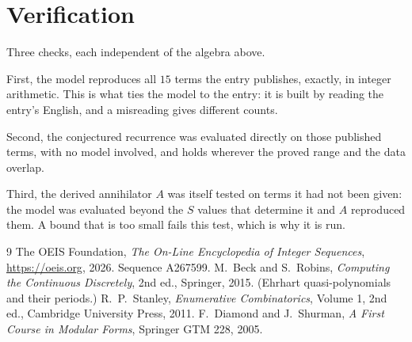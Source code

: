 \documentclass[11pt,a4paper]{article}
\theoremstyle{plain}
\theoremstyle{definition}
\begin{document}
\section{Verification}

Three checks, each independent of the algebra above.

First, the model reproduces all $15$ terms the entry publishes, exactly, in integer
arithmetic. This is what ties the model to the entry: it is built by reading the entry's
English, and a misreading gives different counts.

Second, the conjectured recurrence was evaluated directly on those published terms, with no
model involved, and holds wherever the proved range and the data overlap.

Third, the derived annihilator $A$ was itself tested on terms it had not been given: the model
was evaluated beyond the $S$ values that determine it and $A$ reproduced them. A bound that is
too small fails this test, which is why it is run.

\begin{thebibliography}{9}
 The OEIS Foundation, \emph{The On-Line Encyclopedia of Integer
Sequences}, \url{https://oeis.org}, 2026. Sequence A267599.
 M.~Beck and S.~Robins, \emph{Computing the Continuous Discretely},
2nd ed., Springer, 2015. (Ehrhart quasi-polynomials and their periods.)
 R.~P.~Stanley, \emph{Enumerative Combinatorics}, Volume 1, 2nd ed.,
Cambridge University Press, 2011.
 F.~Diamond and J.~Shurman, \emph{A First Course in Modular Forms},
Springer GTM 228, 2005.
\end{thebibliography}
\end{document}
